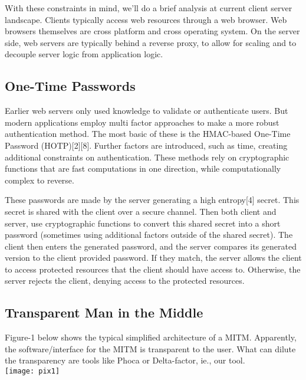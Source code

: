 \documentclass[a4paper, 11pt]{article} 				%
\begin{document}
With these constraints in mind, we'll do a brief analysis at current client server landscape. Clients typically access web resources through a web browser. Web browsers themselves are cross platform and cross operating system. On the server side, web servers are typically behind a reverse proxy, to allow for scaling and to decouple server logic from application logic. 

\subsection{One-Time Passwords}
Earlier web servers only used knowledge to validate or authenticate users. But modern applications employ multi factor approaches to make a more robust authentication method. The most basic of these is the HMAC-based One-Time Password (HOTP)[2][8]. Further factors are introduced, such as time, creating additional constraints on authentication. These methods rely on cryptographic functions that are fast computations in one direction, while computationally complex to reverse.

These passwords are made by the server generating a high entropy[4] secret. This secret is shared with the client over a secure channel. Then both client and server, use cryptographic functions to convert this shared secret into a short password (sometimes using additional factors outside of the shared secret). The client then enters the generated password, and the server compares its generated version to the client provided password. If they match, the server allows the client to access protected resources that the client should have access to. Otherwise, the server rejects the client, denying access to the protected resources.

\subsection{Transparent Man in the Middle}
Figure-1 below shows the typical simplified architecture of a MITM. 
Apparently, the software/interface for the MITM is transparent to the user. What can dilute the transparency are tools like Phoca or Delta-factor, ie., our tool.\\

\texttt{[image: pix1]}
  
\end{document}
